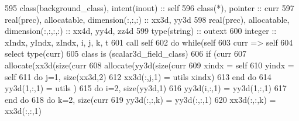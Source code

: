 \begin{DoxyCode}
595     \textcolor{keywordtype}{class}(background\_class), \textcolor{keywordtype}{intent(inout)} :: self
596     \textcolor{keywordtype}{class}(*), \textcolor{keywordtype}{pointer} :: curr
597     \textcolor{keywordtype}{real(prec)}, \textcolor{keywordtype}{allocatable}, \textcolor{keywordtype}{dimension(:,:,:)} :: xx3d, yy3d
598     \textcolor{keywordtype}{real(prec)}, \textcolor{keywordtype}{allocatable}, \textcolor{keywordtype}{dimension(:,:,:,:)} :: xx4d, yy4d, zz4d
599     \textcolor{keywordtype}{type}(string) :: outext
600     \textcolor{keywordtype}{integer} :: xIndx, yIndx, zIndx, i, j, k, t
601     \textcolor{keyword}{call }self%
602     \textcolor{keywordflow}{do} \textcolor{keywordflow}{while}(self%
603         curr => self%
604         \textcolor{keywordflow}{select type}(curr)
605 \textcolor{keywordflow}{        class is} (scalar3d\_field\_class)
606             \textcolor{keywordflow}{if} (curr%
607                 \textcolor{keyword}{allocate}(xx3d(\textcolor{keyword}{size}(curr%
608                 \textcolor{keyword}{allocate}(yy3d(\textcolor{keyword}{size}(curr%
609                 xindx = self%
610                 yindx = self%
611                 \textcolor{keywordflow}{do} j=1, \textcolor{keyword}{size}(xx3d,2)
612                     xx3d(:,j,1) = utils%
      xindx)%
613 \textcolor{keywordflow}{                end do}
614                 yy3d(1,:,1) = utils%
      )%
615                 \textcolor{keywordflow}{do} i=2, \textcolor{keyword}{size}(yy3d,1)
616                     yy3d(i,:,1) = yy3d(1,:,1)
617 \textcolor{keywordflow}{                end do}
618                 \textcolor{keywordflow}{do} k=2, \textcolor{keyword}{size}(curr%
619                     yy3d(:,:,k) = yy3d(:,:,1)
620                     xx3d(:,:,k) = xx3d(:,:,1)

\end{DoxyCode}
